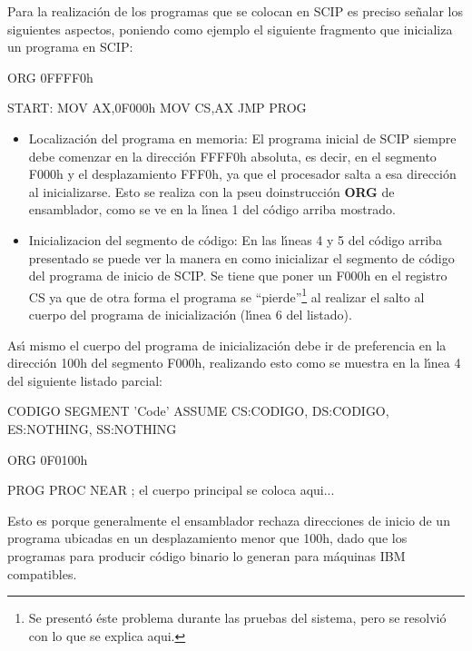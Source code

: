 Para la realizaci\'on de los programas que se colocan en SCIP es preciso se\~nalar los %
siguientes aspectos, poniendo como ejemplo el siguiente fragmento que inicializa un programa en %
SCIP:

\begin{listing}{1}
   ORG 0FFFF0h

 START:
   MOV AX,0F000h
   MOV CS,AX
   JMP PROG
\end{listing} 

\begin{itemize}
\item Localizaci\'on del programa en memoria: El programa inicial de SCIP siempre debe comenzar %
en la direcci\'on FFFF0h absoluta, es decir, en el segmento F000h y el desplazamiento FFF0h, ya %
que el procesador salta a esa direcci\'on al inicializarse. Esto se realiza con la pseu\-%
doins\-truc\-ci\'on {\bf ORG} de ensamblador, como se ve en la l\'{\i}nea 1 del c\'odigo %
arriba mostrado.

\item Inicializacion del segmento de c\'odigo: En las l\'{\i}neas 4 y 5 del c\'odigo arriba %
presentado se puede ver la manera en como inicializar el segmento de c\'odigo del programa de %
inicio de SCIP. Se tiene que poner un F000h en el registro CS ya que de otra forma el programa %
se ``pierde''\footnote{Se present\'o \'este problema durante las pruebas del sistema, pero se %
resolvi\'o con lo que se explica aqui.} al realizar el salto al cuerpo del programa de %
inicializaci\'on (l\'{\i}nea 6 del listado).
\end{itemize}

As\'{\i} mismo el cuerpo del programa de inicializaci\'on debe ir de preferencia en la %
direcci\'on 100h del segmento F000h, realizando esto como se muestra en la l\'{\i}nea 4 del %
siguiente listado parcial:

\begin{listing}{1}
CODIGO SEGMENT 'Code'
   ASSUME CS:CODIGO, DS:CODIGO, ES:NOTHING, SS:NOTHING

   ORG 0F0100h

PROG PROC NEAR  
; el cuerpo principal se coloca aqui...
\end{listing}

Esto es porque generalmente el ensamblador rechaza direcciones de inicio de un programa ubicadas %
en un desplazamiento menor que 100h, dado que los programas para producir c\'odigo binario lo %
generan para m\'aquinas IBM compatibles.

